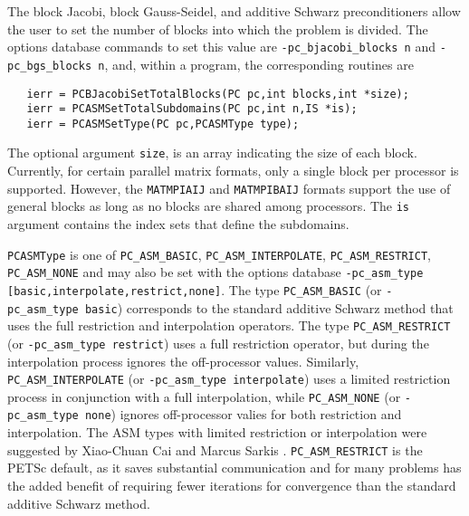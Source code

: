 The block Jacobi, block Gauss-Seidel, and additive Schwarz 
preconditioners allow the user
to set the number of blocks into which the problem is divided.  The
options database commands to set this value are {\tt -pc\_bjacobi\_blocks n}
and {\tt -pc\_bgs\_blocks n}, and, within a program, the corresponding routines
are  
  
\begin{verbatim}
   ierr = PCBJacobiSetTotalBlocks(PC pc,int blocks,int *size);
   ierr = PCASMSetTotalSubdomains(PC pc,int n,IS *is);
   ierr = PCASMSetType(PC pc,PCASMType type);
\end{verbatim}
The 
optional argument {\tt size}, is an array indicating the size of
each block. Currently, for certain parallel matrix formats, only a
single block per processor is supported. However, the {\tt MATMPIAIJ} and 
{\tt MATMPIBAIJ} formats
support the use of general blocks as long as no blocks are shared
among processors. The {\tt is} argument contains the index sets that
define the subdomains. 

{\tt PCASMType} is one of {\tt PC\_ASM\_BASIC},
{\tt PC\_ASM\_INTERPOLATE}, {\tt PC\_ASM\_RESTRICT}, {\tt PC\_ASM\_NONE}
and may also be set with the options database {\tt -pc\_asm\_type [basic,interpolate,restrict,none]}.
   
  
The type {\tt PC\_ASM\_BASIC} (or {\tt -pc\_asm\_type basic}) corresponds to the
standard additive Schwarz method that uses the full restriction and
interpolation operators.
The type {\tt PC\_ASM\_RESTRICT} (or {\tt -pc\_asm\_type restrict}) uses a full
restriction operator, but during the interpolation process ignores the off-processor
values.
Similarly, {\tt PC\_ASM\_INTERPOLATE} (or {\tt -pc\_asm\_type interpolate}) uses a limited
restriction process in conjunction with a full interpolation, while
{\tt PC\_ASM\_NONE} (or {\tt -pc\_asm\_type none}) ignores off-processor valies
for both restriction and interpolation.
The ASM types with limited restriction or interpolation were suggested by 
Xiao-Chuan Cai and Marcus Sarkis \cite{cs97a}.    
{\tt PC\_ASM\_RESTRICT} is the PETSc default, as it saves substantial communication
and for many problems has the added benefit of requiring fewer iterations for convergence
than the standard additive Schwarz method.

